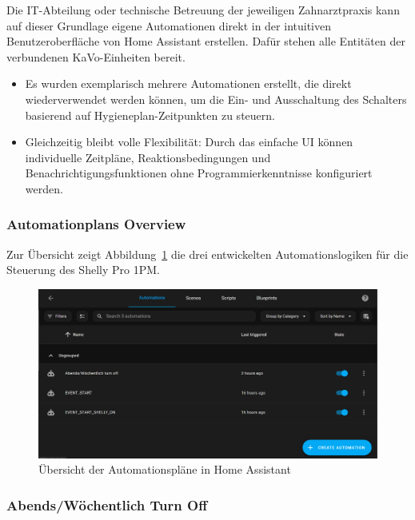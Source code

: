 Die IT-Abteilung oder technische Betreuung der jeweiligen Zahnarztpraxis kann auf dieser Grundlage eigene Automationen direkt in der intuitiven Benutzeroberfläche von Home Assistant erstellen. Dafür stehen alle Entitäten der verbundenen KaVo-Einheiten bereit. 

\begin{itemize}
  \item Es wurden exemplarisch mehrere Automationen erstellt, die direkt wiederverwendet werden können, um die Ein- und Ausschaltung des Schalters basierend auf Hygieneplan-Zeitpunkten zu steuern.\\
  \item Gleichzeitig bleibt volle Flexibilität: Durch das einfache UI können individuelle Zeitpläne, Reaktionsbedingungen und Benachrichtigungsfunktionen ohne Programmierkenntnisse konfiguriert werden.
\end{itemize}

\subsubsection{Automationplans Overview}

Zur Übersicht zeigt Abbildung~\ref{fig:automation_overview} die drei entwickelten Automationslogiken für die Steuerung des Shelly Pro 1PM.

\begin{figure}[H]
  \centering
  \includegraphics[width=\linewidth]{images/Automation_overview.png}
  \caption{Übersicht der Automationspläne in Home Assistant}
  \label{fig:automation_overview}
\end{figure}

\subsubsection{Abends/Wöchentlich Turn Off}

